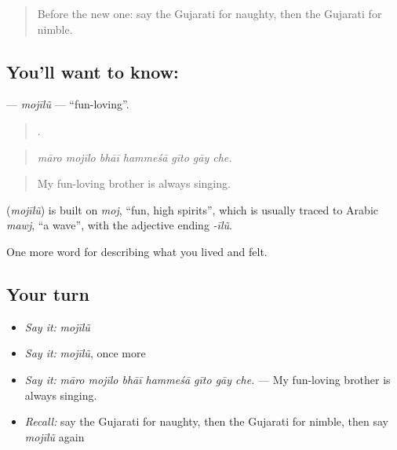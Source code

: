 \begin{quote}
Before the new one: say the Gujarati for naughty, then the Gujarati for nimble.
\end{quote}

\subsection*{You'll want to know: }
\textbf{} — \emph{mojīlũ} — \textquotedblleft{}fun-loving\textquotedblright{}.

\begin{quote}
      .
\end{quote}

\begin{quote}
\emph{māro mojīlo bhāī hammeśā gīto gāy che.}
\end{quote}

\begin{quote}
My fun-loving brother is always singing.
\end{quote}

\begin{cousinweb}
\textbf{} (\emph{mojīlũ}) is built on \emph{moj}, \textquotedblleft{}fun, high spirits\textquotedblright{}, which is usually traced to Arabic \emph{mawj}, \textquotedblleft{}a wave\textquotedblright{}, with the adjective ending \emph{-īlũ}.
\end{cousinweb}

\begin{grammarlens}[title={What you've built}]
One more word for describing what you lived and felt.
\end{grammarlens}

\subsection*{Your turn}
\begin{itemize}
\raggedright
  \item \emph{Say it:} \emph{mojīlũ}
  \item \emph{Say it:} \emph{mojīlũ}, once more
  \item \emph{Say it:} \emph{māro mojīlo bhāī hammeśā gīto gāy che.} — My fun-loving brother is always singing.
  \item \emph{Recall:} say the Gujarati for naughty, then the Gujarati for nimble, then say \emph{mojīlũ} again
\end{itemize}

